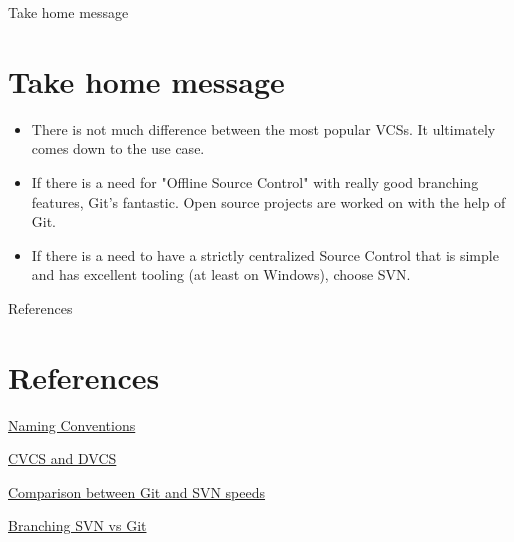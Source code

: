 \documentclass{beamer}
\begin{document}
\begin{frame}{Take home message}
\section{Take home message}
\begin{itemize}
    \item There is not much difference between the most popular VCSs. It ultimately comes down to the use case.
    \item If there is a need for "Offline Source Control" with really good branching features, Git's fantastic. Open source projects are worked on with the help of Git. 
    \item If there is a need to have a strictly centralized Source Control that is simple and has excellent tooling (at least on Windows), choose SVN.
\end{itemize}
    
\end{frame}

\begin{frame}{References}
  \section{References}
    
  \begin{thebibliography}{10}


	\href{https://doctorfreelance.com/file-naming-conventions/}{Naming Conventions}

	\href{https://www.appfusions.com/display/StashSCMImporter/CVCS+vs.+DVCS+In+a+Nutshell
}{CVCS and DVCS}

\href{https://git-scm.com/about/small-and-fast}{Comparison between Git and SVN speeds}
	
	\href{https://stackoverflow.com/questions/2471606/how-and-or-why-is-merging-in-git-better-than-in-svn
	}{Branching SVN vs Git}
	



  \end{thebibliography}
\end{frame}
\end{document}
